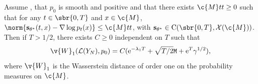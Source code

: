 \begin{theorem}
	\label{thm:weak_qualitative_appendix}
	Assume , that \(p_0\) is smooth and positive and that there exists \(\c{M}tt \geq 0\) such that for any \(t \in \sbr{0,T}\) and \(x \in \c{M}\), \(\norm{\mathbf{s}_{\theta^{\star}}(t,x) - \nabla \log p_{t}(x)} \leq \c{M}tt\), with \(\mathbf{s}_{\theta^\star} \in \mathrm{C}(\sbr{0,T}, \mathcal{X}(\c{M}))\).
	Then if \(T > 1/2\), there exists \(C \geq 0\) independent on \(T\) such that \begin{equation} { \v{W}_1(\mathcal{L}(Y_N), p_0) = C ( \mathrm{e}^{-\lambda_1 T} + \sqrt{T/2} \mathtt{M} + \mathrm{e}^T \gamma^{1/2}) , } \end{equation} where \(\v{W}_1\) is the Wasserstein distance of order one on the probability measures on \(\c{M}\).
\end{theorem}

